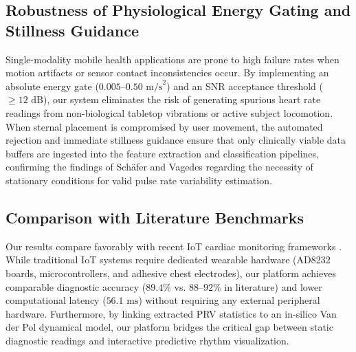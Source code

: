 \subsection{Robustness of Physiological Energy Gating and Stillness Guidance}
Single-modality mobile health applications are prone to high failure rates when motion artifacts or sensor contact inconsistencies occur. By implementing an absolute energy gate ($0.005\text{--}0.50\text{ m/s}^2$) and an SNR acceptance threshold ($\ge 12\text{ dB}$), our system eliminates the risk of generating spurious heart rate readings from non-biological tabletop vibrations or active subject locomotion. When sternal placement is compromised by user movement, the automated rejection and immediate stillness guidance ensure that only clinically viable data buffers are ingested into the feature extraction and classification pipelines, confirming the findings of Schäfer and Vagedes \cite{schafer2013accurate} regarding the necessity of stationary conditions for valid pulse rate variability estimation.

\subsection{Comparison with Literature Benchmarks}
Our results compare favorably with recent IoT cardiac monitoring frameworks \cite{pandian2026internet, tsamis2017soft, chai2013mobile}. While traditional IoT systems require dedicated wearable hardware (AD8232 boards, microcontrollers, and adhesive chest electrodes), our platform achieves comparable diagnostic accuracy ($89.4\%$ vs. $88\text{--}92\%$ in literature) and lower computational latency ($56.1\text{ ms}$) without requiring any external peripheral hardware. Furthermore, by linking extracted PRV statistics to an in-silico Van der Pol dynamical model, our platform bridges the critical gap between static diagnostic readings and interactive predictive rhythm visualization.
